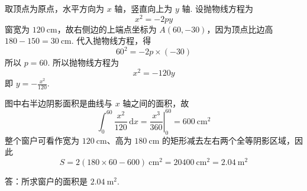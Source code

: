 \begin{solution}
取顶点为原点，水平方向为 \(x\) 轴，竖直向上为 \(y\) 轴. 设抛物线方程为
\[
x^2=-2py
\]
窗宽为 \(120\mathrm{~cm}\)，故右侧边的上端点坐标为 \(A(60,-30)\)，因为顶点比边高 \(180-150=30\mathrm{~cm}\). 代入抛物线方程，得
\[
60^2=-2p\times(-30)
\]
所以 \(p=60\).
所以抛物线方程为
\[
x^2=-120y
\]
即 \(y=-\frac{x^2}{120}\).


图中右半边阴影面积是曲线与 \(x\) 轴之间的面积，故
\[
\int_0^{60}\frac{x^2}{120}\,\mathrm{d}x
=\left.\frac{x^3}{360}\right|_0^{60}
=600\mathrm{~cm}^2
\]
整个窗户可看作宽为 \(120\mathrm{~cm}\)、高为 \(180\mathrm{~cm}\) 的矩形减去左右两个全等阴影区域，因此
\[
S=2\left(180\times 60-600\right)\mathrm{~cm}^2
=20400\mathrm{~cm}^2
=2.04\mathrm{~m}^2
\]

答：所求窗户的面积是 \(2.04\mathrm{~m}^2\).
\end{solution}
